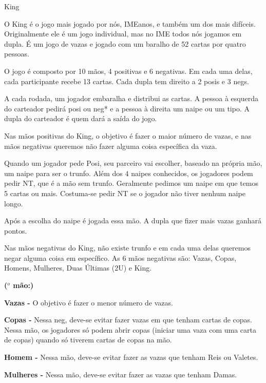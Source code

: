 \begin{subsecao}{King}

O King é o jogo mais jogado por nós, IMEanos, e também um dos mais difíceis.
Originalmente ele é um jogo individual, mas no IME todos nós jogamos em
dupla. É um jogo de vazas e jogado com um baralho de 52 cartas por quatro
pessoas.

O jogo é composto por 10 mãos, 4 positivas e 6 negativas. Em cada uma delas,
cada participante recebe 13 cartas. Cada dupla tem direito a 2 posis e 3 negs.

A cada rodada, um jogador embaralha e distribui as cartas. A pessoa à esquerda
do carteador pedirá posi ou neg* e a pessoa à direita um naipe ou um tipo. A dupla do
carteador é quem dará a saída do jogo.

Nas mãos positivas do King, o objetivo é fazer o maior número de vazas, e nas
mãos negativas queremos não fazer alguma coisa específica da vaza.

Quando um jogador pede Posi, seu parceiro vai escolher, baseado na própria mão,
um naipe para ser o trunfo. Além dos 4 naipes conhecidos, os jogadores podem
pedir NT, que é a mão sem trunfo. Geralmente pedimos um naipe em que temos 5
cartas ou mais. Costuma-se pedir NT se o jogador não tiver nenhum naipe longo.

Após a escolha do naipe é jogada essa mão. A dupla que fizer mais vazas ganhará
pontos.

Nas mãos negativas do King, não existe trunfo e em cada uma delas queremos negar
alguma coisa em específico. As 6 mãos negativas são: Vazas, Copas, Homens,
Mulheres, Duas Últimas (2U) e King.


\begin{list}{\textbf{ ($^{o}$ mão:)}}{}

\item \textbf{Vazas -} O objetivo é fazer o menor número de vazas.

\item \textbf{Copas -}  Nessa neg, deve-se evitar fazer vazas em que tenham
cartas de copas. Nessa mão, os jogadores só podem abrir copas (iniciar uma
vaza com uma carta de copas) quando só tiverem cartas de copas na mão.

\item \textbf{Homem -} Nessa mão, deve-se evitar fazer as vazas que tenham Reis
ou Valetes.

\item \textbf{Mulheres -} Nessa mão, deve-se evitar fazer as vazas que tenham
Damas.


\end{list}
\end{subsecao}
